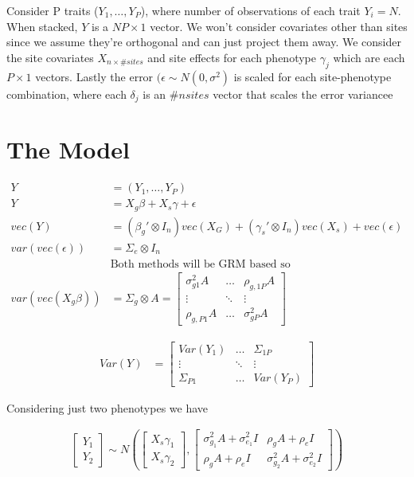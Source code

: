 \documentclass[10pt,a4paper]{article}
\author{Christian Coffman}
\begin{document}
Consider P traits ($Y_1, \dots, Y_P$), where number of observations of each trait $Y_i= N$. When stacked, $Y$ is a $NP \times 1$ vector. We won't consider covariates other than sites since we assume they're orthogonal and can just project them away. We consider the site covariates $X_{n \times \# sites}$ and site effects for each phenotype $\gamma_j$ which are each $P\times 1$ vectors. Lastly the error $(\epsilon \sim N(0, \sigma^2)$ is scaled for each site-phenotype combination, where each $\delta_j$ is an $\#nsites$ vector that scales the error variancee
   
\section{The Model}
\begin{align*}
	Y & = (Y_1, \dots , Y_P) \\
	Y & = X_g\beta + X_s \gamma + \epsilon\\
	vec(Y) & = (\beta_g' \otimes I_n)vec(X_G)  + (\gamma_s'\otimes I_n)vec(X_s) + vec(\epsilon) \\
	var(vec(\epsilon)) & = \Sigma_e \otimes I_n \\
& \text{Both methods will be GRM based so} \\
	var(vec(X_g\beta)) & = \Sigma_g\otimes A = \begin{bmatrix}
	\sigma_{g1}^2 A & \dots & \rho_{g,1P}A\\
	\vdots & \ddots & \vdots \\
	\rho_{g,P1}A & \dots & \sigma_{gP}^2 A
	\end{bmatrix}
\end{align*}




\begin{align*}
	Var(Y) & = \begin{bmatrix}
	Var(Y_1) & \dots & \Sigma_{1P} \\ 
	\vdots & \ddots & \vdots \\
	\Sigma_{P1} & \dots & Var(Y_P)
	\end{bmatrix}
\end{align*}

Considering just two phenotypes we have

\begin{align*}
	\begin{bmatrix}
	Y_1\\
	Y_2 
	\end{bmatrix}\sim N(\begin{bmatrix}
	X_s\gamma_1 \\
	X_s\gamma_2
	\end{bmatrix}
	,
	\begin{bmatrix}
	\sigma_{g_1}^2A + \sigma_{e_1}^2I & \rho_gA + \rho_e I\\
	\rho_gA + \rho_eI & \sigma_{g_2}^2A  + \sigma_{e_2}^2I
	\end{bmatrix}) \\
\end{align*}
\end{document}
